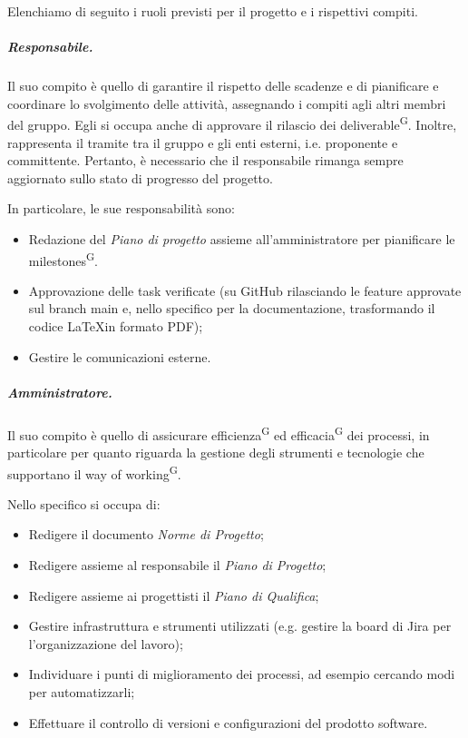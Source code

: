 \noindent Elenchiamo di seguito i ruoli previsti per il progetto e i rispettivi compiti.
\subparagraph{Responsabile.}
Il suo compito è quello di garantire il rispetto delle scadenze e di pianificare e coordinare lo svolgimento delle attività, assegnando i compiti agli altri membri del gruppo. Egli si occupa anche di approvare il rilascio dei deliverable\textsuperscript{G}.
Inoltre, rappresenta il tramite tra il gruppo e gli enti esterni, i.e. proponente e committente. Pertanto, è necessario che il responsabile rimanga sempre aggiornato sullo stato di progresso del progetto.

In particolare, le sue responsabilità sono:
\begin{itemize}
    \item Redazione del \textit{Piano di progetto} %
    assieme all'amministratore per pianificare le milestones\textsuperscript{G}.
    \item Approvazione delle task verificate (su GitHub rilasciando le feature approvate sul branch main e, nello specifico per la documentazione, trasformando il codice \LaTeX\space in formato PDF);
    \item Gestire le comunicazioni esterne.
\end{itemize}

\subparagraph{Amministratore.}
Il suo compito è quello di assicurare efficienza\textsuperscript{G} ed efficacia\textsuperscript{G} dei processi, in particolare per quanto riguarda la gestione degli strumenti e tecnologie che supportano il way of working\textsuperscript{G}.

Nello specifico si occupa di:
\begin{itemize}
    \item Redigere il documento \textit{Norme di Progetto};
    \item Redigere assieme al responsabile il \textit{Piano di Progetto};
    \item Redigere assieme ai progettisti il \textit{Piano di Qualifica};
    \item Gestire infrastruttura e strumenti utilizzati (e.g. gestire la board di Jira per l'organizzazione del lavoro);
    \item Individuare i punti di miglioramento dei processi, ad esempio cercando modi per automatizzarli;
    \item Effettuare il controllo di versioni e configurazioni del prodotto software.
\end{itemize}

